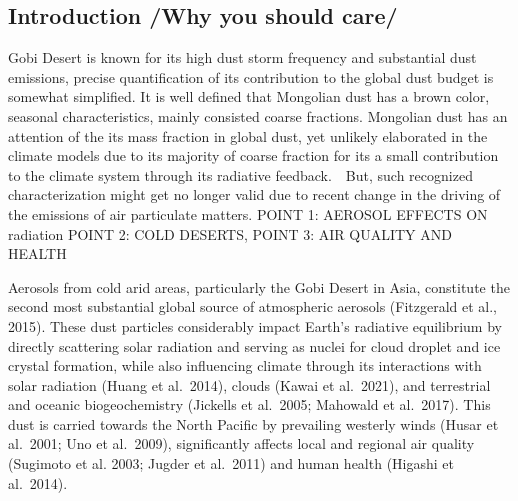 \documentclass[
  11pt,
]{article}
\begin{document}
\newpage

\subsection{Introduction /Why you should
care/}\label{introduction-why-you-should-care}

Gobi Desert is known for its high dust storm frequency and substantial
dust emissions, precise quantification of its contribution to the global
dust budget is somewhat simplified. It is well defined that Mongolian
dust has a brown color, seasonal characteristics, mainly consisted
coarse fractions. Mongolian dust has an attention of the its mass
fraction in global dust, yet unlikely elaborated in the climate models
due to its majority of coarse fraction for its a small contribution to
the climate system through its radiative feedback.　But, such recognized
characterization might get no longer valid due to recent change in the
driving of the emissions of air particulate matters. POINT 1: AEROSOL
EFFECTS ON radiation POINT 2: COLD DESERTS, POINT 3: AIR QUALITY AND
HEALTH

Aerosols from cold arid areas, particularly the Gobi Desert in Asia,
constitute the second most substantial global source of atmospheric
aerosols (Fitzgerald et al., 2015). These dust particles considerably
impact Earth's radiative equilibrium by directly scattering solar
radiation and serving as nuclei for cloud droplet and ice crystal
formation, while also influencing climate through its interactions with
solar radiation (Huang et al.~2014), clouds (Kawai et al.~2021), and
terrestrial and oceanic biogeochemistry (Jickells et al.~2005; Mahowald
et al.~2017). This dust is carried towards the North Pacific by
prevailing westerly winds (Husar et al.~2001; Uno et al.~2009),
significantly affects local and regional air quality (Sugimoto et al.
2003; Jugder et al.~2011) and human health (Higashi et al.~2014).
\end{document}
